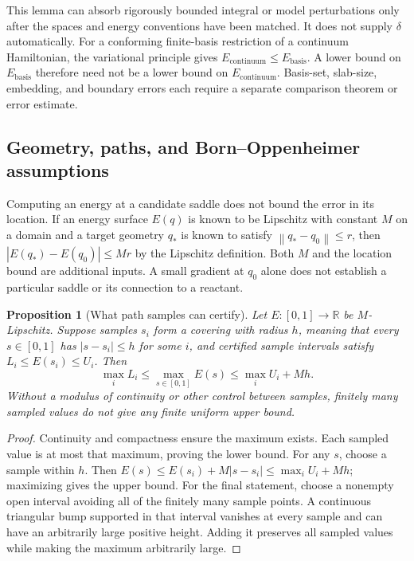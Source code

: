 \documentclass[11pt,a4paper]{article}
\theoremstyle{plain}
\newtheorem{proposition}[theorem]{Proposition}
\theoremstyle{definition}
\theoremstyle{remark}
\newcommand{\norm}[1]{\left\lVert #1\right\rVert}
\newcommand{\R}{\mathbb{R}}
\begin{document}
This lemma can absorb rigorously bounded integral or model perturbations
only after the spaces and energy conventions have been matched. It does not
supply $\delta$ automatically. For a conforming finite-basis restriction of
a continuum Hamiltonian, the variational principle gives
$E_{\mathrm{continuum}}\le E_{\mathrm{basis}}$. A lower bound on
$E_{\mathrm{basis}}$ therefore need not be a lower bound on
$E_{\mathrm{continuum}}$. Basis-set, slab-size, embedding, and boundary
errors each require a separate comparison theorem or error estimate.

\subsection{Geometry, paths, and Born--Oppenheimer assumptions}
Computing an energy at a candidate saddle does not bound the error in its
location. If an energy surface $E(q)$ is known to be Lipschitz with constant
$M$ on a domain and a target geometry $q_*$ is known to satisfy
$\norm{q_*-q_0}\le r$, then $|E(q_*)-E(q_0)|\le Mr$ by the
Lipschitz definition. Both $M$ and the location bound are additional inputs.
A small gradient at $q_0$ alone does not establish a particular saddle or
its connection to a reactant.

\begin{proposition}[What path samples can certify]
\label{prop:path}
Let $E:[0,1]\to\R$ be $M$-Lipschitz. Suppose samples $s_i$ form a
covering with radius $h$, meaning that every $s\in[0,1]$ has
$|s-s_i|\le h$ for some $i$, and certified sample intervals satisfy
$L_i\le E(s_i)\le U_i$. Then
\begin{equation}
 \max_i L_i\le\max_{s\in[0,1]} E(s)\le\max_i U_i+Mh.
 \label{eq:path}
\end{equation}
Without a modulus of continuity or other control between samples, finitely
many sampled values do not give any finite uniform upper bound.
\end{proposition}
\begin{proof}
Continuity and compactness ensure the maximum exists. Each sampled value is
at most that maximum, proving the lower bound. For any $s$, choose a
sample within $h$. Then
$E(s)\le E(s_i)+M|s-s_i|\le\max_i U_i+Mh$; maximizing gives the
upper bound. For the final statement, choose a nonempty open interval
avoiding all of the finitely many sample points. A continuous triangular
bump supported in that interval vanishes at every sample and can have an
arbitrarily large positive height. Adding it preserves all sampled values
while making the maximum arbitrarily large.
\end{proof}
\end{document}
